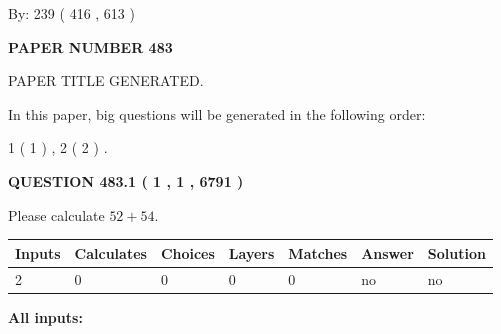 \documentclass[12pt]{article}
\begin{document}
   
\hspace{1.0in} By: 
 239 ( 416 ,  613 )
   
   
   
   
\newpage 
\setcounter{page}{ 
   483001 } 
   
   
   
   
 {\textbf{ \Large{ PAPER NUMBER  483  }}}
   
   
\vspace{0.2in}
   
   
   
   
   
   
   
   
 \vspace{0.2in}
 
 
 
 
   
   
 PAPER TITLE GENERATED.
   
   
   
\vspace{0.2in}
   
In this paper, big questions will be generated in the following order: 
   
   
   1 ( 1 )
 ,
   2 ( 2 )
 .
  
\vspace{0.2in}
  
{\textbf{\Large{QUESTION
483.1 
 ( 1 , 1 , 6791 )
}}}
  
  
 
Please calculate $ %
52 +  %
54 $.
 
 
   
   
   
   
\noindent\begin{tabular}{|l|l|l|l|l|l|l|}
 \hline
Inputs & Calculates & Choices & Layers & Matches & Answer & Solution \\ \hline
 2  & 
 0  & 
 0
  & 
 0  & 
 0  & 
  no & 
  no 
  \\ \hline
 \end{tabular}
   
   
   
   
\noindent{}
   
   
   
   
\noindent\vspace{0.1in}\hspace{-0.08in} {\textbf{\Large{All inputs: }}}
   
\end{document}
